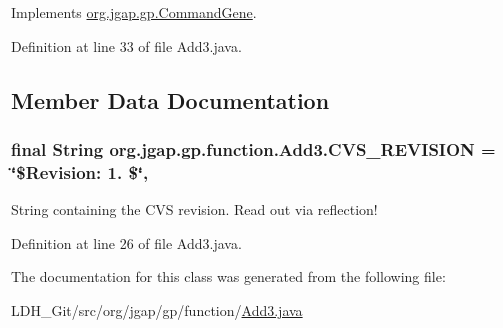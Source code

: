 Implements \hyperlink{classorg_1_1jgap_1_1gp_1_1_command_gene_a236141d99059da808afe7a9217e411c7}{org.\-jgap.\-gp.\-Command\-Gene}.



Definition at line 33 of file Add3.\-java.



\subsection{Member Data Documentation}
\hypertarget{classorg_1_1jgap_1_1gp_1_1function_1_1_add3_a0d32aec6060c2b0611837a6d42e84d47}{
\subsubsection[{C\-V\-S\-\_\-\-R\-E\-V\-I\-S\-I\-O\-N}]{\setlength{\rightskip}{0pt plus 5cm}final String org.\-jgap.\-gp.\-function.\-Add3.\-C\-V\-S\-\_\-\-R\-E\-V\-I\-S\-I\-O\-N = \char`\"{}\$Revision\-: 1. \$\char`\"{}\hspace{0.3cm}{\ttfamily [static]}, {\ttfamily [private]}}}\label{classorg_1_1jgap_1_1gp_1_1function_1_1_add3_a0d32aec6060c2b0611837a6d42e84d47}
String containing the C\-V\-S revision. Read out via reflection! 

Definition at line 26 of file Add3.\-java.



The documentation for this class was generated from the following file\-:\begin{DoxyCompactItemize}
\item 
L\-D\-H\-\_\-\-Git/src/org/jgap/gp/function/\hyperlink{_add3_8java}{Add3.\-java}\end{DoxyCompactItemize}
